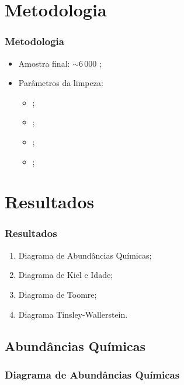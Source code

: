 \documentclass[10pt, aspectratio=169]{slidesiffmodelo}
\begin{document}
\section{Metodologia}
\begin{frame}[t, img]
\frametitle{Metodologia}
    \begin{itemize}
        \item Amostra final: $\sim 6\,000$ \estrela;
        \item Parâmetros da limpeza: 
        \begin{itemize}
            \item \feh;
            \item \mgfe; 
            \item \teff;
            \item \logg;
        \end{itemize}
    \end{itemize}
\end{frame}

\section{Resultados}

\begin{frame}[t,img]
    \frametitle{Resultados}
    \begin{textoimagem}
        \begin{enumerate}
            \item Diagrama de Abundâncias Químicas;
            \item Diagrama de Kiel e Idade;
            \item Diagrama de Toomre;
            \item Diagrama Tinsley-Wallerstein.
        \end{enumerate}
        
    \colunaimagem
    
    \end{textoimagem}
\end{frame}

\subsection{Abundâncias Químicas}
\begin{frame}[t,img]
    \frametitle{Diagrama de Abundâncias Químicas}
    \vspace*{-1em}
\end{frame}
\end{document}

